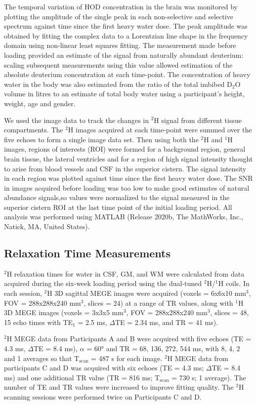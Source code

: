 \documentclass[class=article, crop=false]{standalone}
\begin{document}
The temporal variation of HOD concentration in the brain was monitored by plotting the amplitude of the single peak in each non-selective and selective spectrum against time since the first heavy water dose. The peak amplitude was obtained by fitting the complex data to a Lorentzian line shape in the frequency domain using non-linear least squares fitting. The measurement made before loading provided an estimate of the signal from naturally abundant deuterium: scaling subsequent measurements using this value allowed estimation of the absolute deuterium concentration at each time-point. The concentration of heavy water in the body was also estimated from the ratio of the total imbibed D$_2$O volume in litres to an estimate of total body water using a participant’s height, weight, age and gender\cite{Watson1980TotalMeasurements}.

We used the image data to track the changes in $^2$H signal from different tissue compartments. The $^2$H images acquired at each time-point were summed over the five echoes to form a single image data set. Then using both the $^2$H and $^1$H images, regions of interests (ROI) were formed for a background region, general brain tissue, the lateral ventricles and for a region of high signal intensity thought to arise from blood vessels and CSF in the superior cistern. The signal intensity in each region was plotted against time since the first heavy water dose. The SNR in images acquired before loading was too low to make good estimates of natural abundance signals,so values were normalized to the signal measured in the superior cistern ROI at the last time point of the initial loading period. All analysis was performed using MATLAB (Release 2020b, The MathWorks, Inc., Natick, MA, United States).

\subsection{Relaxation Time Measurements}

$^2$H relaxation times for water in CSF, GM, and WM were calculated from data acquired during the six-week loading period using the dual-tuned $^2$H/$^1$H coils. In each session, $^2$H 3D sagittal MEGE images were acquired (voxels = 6x6x10 mm$^3$, FOV = 288x288x240 mm$^3$, slices = 24) at a range of TR values, along with $^1$H 3D MEGE images (voxels = 3x3x5 mm$^3$, FOV = 288x288x240 mm$^3$, slices = 48, 15 echo times with TE$_1$ = 2.5 ms, $\Delta$TE = 2.34 ms, and TR = 41 ms). 

$^2$H MEGE data from Participants A and B were acquired with five echoes (TE = 4.3 ms, $\Delta$TE = 8.4 ms), $\alpha$ = 60° and TR = 68, 136, 272, 544 ms, with 8, 4, 2 and 1 averages so that T$_\text{scan}$ = 487 s for each image. $^2$H MEGE data from participants C and D was acquired with six echoes (TE = 4.3 ms; $\Delta$TE = 8.4 ms) and one additional TR value (TR = 816 ms; T$_\text{scan}$ = 730 s; 1 average). 
The number of TE and TR values were increased to improve fitting quality. The $^2$H scanning sessions were performed twice on Participants C and D.
\end{document}
